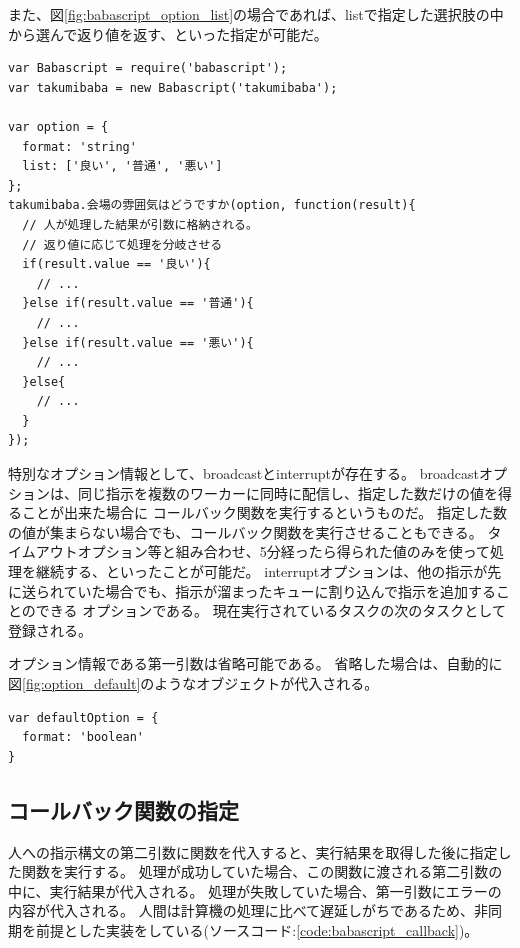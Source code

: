 また、図\ref{fig:babascript_option_list}の場合であれば、listで指定した選択肢の中から選んで返り値を返す、といった指定が可能だ。

\begin{lstlisting}[caption=オプション情報のサンプルソースコードその2, label=code:babascriptux5foptionux5flist]
var Babascript = require('babascript');
var takumibaba = new Babascript('takumibaba');

var option = {
  format: 'string'
  list: ['良い', '普通', '悪い']
};
takumibaba.会場の雰囲気はどうですか(option, function(result){
  // 人が処理した結果が引数に格納される。
  // 返り値に応じて処理を分岐させる
  if(result.value == '良い'){
    // ...
  }else if(result.value == '普通'){
    // ...
  }else if(result.value == '悪い'){
    // ...
  }else{
    // ...
  }
});

\end{lstlisting}

特別なオプション情報として、broadcastとinterruptが存在する。
broadcastオプションは、同じ指示を複数のワーカーに同時に配信し、指定した数だけの値を得ることが出来た場合に
コールバック関数を実行するというものだ。
指定した数の値が集まらない場合でも、コールバック関数を実行させることもできる。
タイムアウトオプション等と組み合わせ、5分経ったら得られた値のみを使って処理を継続する、といったことが可能だ。
interruptオプションは、他の指示が先に送られていた場合でも、指示が溜まったキューに割り込んで指示を追加することのできる
オプションである。
現在実行されているタスクの次のタスクとして登録される。

オプション情報である第一引数は省略可能である。
省略した場合は、自動的に図\ref{fig:option_default}のようなオブジェクトが代入される。

\begin{lstlisting}[caption=デフォルトのオプション情報, label=code:optionux5fdefault]
var defaultOption = {
  format: 'boolean'
}
\end{lstlisting}

\subsection{コールバック関数の指定}\label{ux30b3ux30fcux30ebux30d0ux30c3ux30afux95a2ux6570ux306eux6307ux5b9a}

人への指示構文の第二引数に関数を代入すると、実行結果を取得した後に指定した関数を実行する。
処理が成功していた場合、この関数に渡される第二引数の中に、実行結果が代入される。
処理が失敗していた場合、第一引数にエラーの内容が代入される。
人間は計算機の処理に比べて遅延しがちであるため、非同期を前提とした実装をしている(ソースコード:\ref{code:babascript_callback})。

